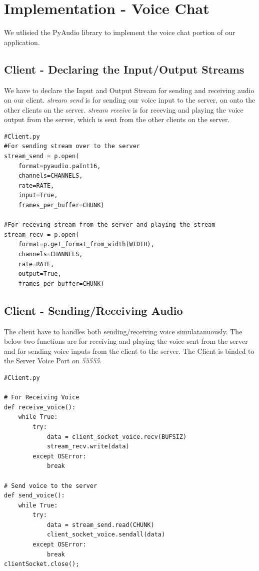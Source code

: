 \documentclass[a4paper,11pt]{article}
\begin{document}
\section{Implementation - Voice Chat}
We utlisied the PyAudio library to implement the voice chat portion of our application.

\subsection{Client - Declaring the Input/Output Streams}
We have to declare the Input and Output Stream for sending and receiving audio on our client. \textit{stream send} is for sending our voice input to the server, on onto the other clients on the server. \textit{stream receive} is for receving and playing the voice output from the server, which is sent from the other clients on the server.
\begin{mdframed}[backgroundcolor=light-gray, roundcorner=30pt,leftmargin=1, rightmargin=1, innerleftmargin=5, innertopmargin=-3,innerbottommargin=5, outerlinewidth=1, linecolor=light-gray]
\begin{lstlisting}
#Client.py
#For sending stream over to the server
stream_send = p.open(
	format=pyaudio.paInt16,
	channels=CHANNELS,
	rate=RATE,
	input=True,
	frames_per_buffer=CHUNK)

#For receving stream from the server and playing the stream
stream_recv = p.open(
	format=p.get_format_from_width(WIDTH),
	channels=CHANNELS,
	rate=RATE,
	output=True,
	frames_per_buffer=CHUNK)

\end{lstlisting}
\end{mdframed}

\subsection{Client - Sending/Receiving  Audio}
The client have to handles both sending/receiving voice simulatanuously. The below two functions are for receiving and playing the voice sent from the server and for sending voice inputs from the client to the server. The Client is binded to the Server Voice Port on \textit{55555}.
\begin{mdframed}[backgroundcolor=light-gray, roundcorner=30pt,leftmargin=1, rightmargin=1, innerleftmargin=5, innertopmargin=-3,innerbottommargin=5, outerlinewidth=1, linecolor=light-gray]
\begin{lstlisting}
#Client.py

# For Receiving Voice
def receive_voice():
	while True:
		try:
			data = client_socket_voice.recv(BUFSIZ)
			stream_recv.write(data)
		except OSError:
			break

# Send voice to the server
def send_voice():
	while True:
		try:
			data = stream_send.read(CHUNK)
			client_socket_voice.sendall(data)
		except OSError:
			break
clientSocket.close();
\end{lstlisting}
\end{mdframed}
\end{document}
